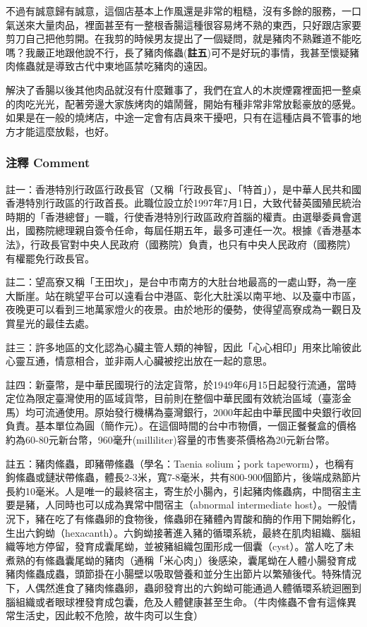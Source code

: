 \documentclass[a5paper, 12pt
]{book}
\begin{document}
\begin{enumerate}
  不過有誠意歸有誠意，這個店基本上作風還是非常的粗糙，沒有多餘的服務，一口氣送來大量肉品，裡面甚至有一整根香腸這種很容易烤不熟的東西，只好跟店家要剪刀自己把他剪開。在我剪的時候男友提出了一個疑問，就是豬肉不熟難道不能吃嗎？我嚴正地跟他說不行，長了豬肉絛蟲(\textbf{註五})可不是好玩的事情，我甚至懷疑豬肉絛蟲就是導致古代中東地區禁吃豬肉的遠因。

  解決了香腸以後其他肉品就沒有什麼難事了，我們在宜人的木炭煙霧裡面把一整桌的肉吃光光，配著旁邊大家族烤肉的嬉鬧聲，開始有種非常非常放鬆豪放的感覺。如果是在一般的燒烤店，中途一定會有店員來干擾吧，只有在這種店員不管事的地方才能這麼放鬆，也好。
\end{enumerate}

\hypertarget{ux6ce8ux91cb-comment}{%
\subsubsection{注釋 Comment}\label{ux6ce8ux91cb-comment}}

註一：香港特別行政區行政長官（又稱「行政長官」、「特首」），是中華人民共和國香港特別行政區的行政首長。此職位設立於1997年7月1日，大致代替英國殖民統治時期的「香港總督」一職，行使香港特別行政區政府首腦的權責。由選舉委員會選出，國務院總理親自簽令任命，每屆任期五年，最多可連任一次。根據《香港基本法》，行政長官對中央人民政府（國務院）負責，也只有中央人民政府（國務院）有權罷免行政長官。

註二：望高寮又稱「王田坎」，是台中市南方的大肚台地最高的一處山野，為一座大斷崖。站在眺望平台可以遠看台中港區、彰化大肚溪以南平地、以及臺中市區，夜晚更可以看到三地萬家燈火的夜景。由於地形的優勢，使得望高寮成為一觀日及賞星光的最佳去處。

註三：許多地區的文化認為心臟主管人類的神智，因此「心心相印」用來比喻彼此心靈互通，情意相合，並非兩人心臟被挖出放在一起的意思。

註四：新臺幣，是中華民國現行的法定貨幣，於1949年6月15日起發行流通，當時定位為限定臺灣使用的區域貨幣，目前則在整個中華民國有效統治區域（臺澎金馬）均可流通使用。原始發行機構為臺灣銀行，2000年起由中華民國中央銀行收回負責。基本單位為圓（簡作元）。在這個時間的台中市物價，一個正餐餐盒的價格約為60-80元新台幣，960毫升(milliliter)容量的市售麥茶價格為20元新台幣。

註五：豬肉絛蟲，即豬帶絛蟲（學名：Taenia solium；pork
tapeworm），也稱有鉤絛蟲或鏈狀帶絛蟲，體長2-3米，寬7-8毫米，共有800-900個節片，後端成熟節片長約10毫米。人是唯一的最終宿主，寄生於小腸內，引起豬肉絛蟲病，中間宿主主要是豬，人同時也可以成為異常中間宿主（abnormal
intermediate
host）。一般情況下，豬在吃了有絛蟲卵的食物後，絛蟲卵在豬體內胃酸和酶的作用下開始孵化，生出六鉤蚴（hexacanth）。六鉤蚴接著進入豬的循環系統，最終在肌肉組織、腦組織等地方停留，發育成囊尾蚴，並被豬組織包圍形成一個囊（cyst）。當人吃了未煮熟的有絛蟲囊尾蚴的豬肉（通稱「米心肉」）後感染，囊尾蚴在人體小腸發育成豬肉絛蟲成蟲，頭節掛在小腸壁以吸取營養和並分生出節片以繁殖後代。特殊情況下，人偶然進食了豬肉絛蟲卵，蟲卵發育出的六鉤蚴可能通過人體循環系統迴圈到腦組織或者眼球裡發育成包囊，危及人體健康甚至生命。（牛肉絛蟲不會有這條異常生活史，因此較不危險，故牛肉可以生食）
\end{document}
